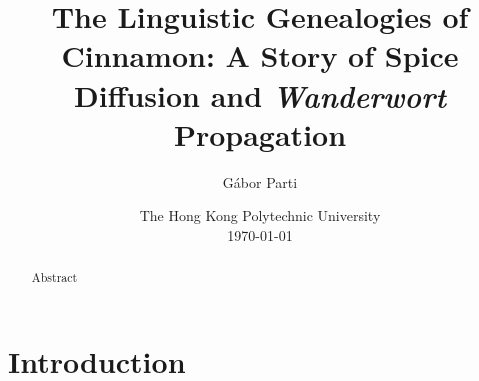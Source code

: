 \documentclass[12pt]{article}
\title{The Linguistic Genealogies of Cinnamon: A Story of Spice Diffusion and \textit{Wanderwort} Propagation}
\author{Gábor Parti {\small\orcid{0000-0003-2042-4655}}}
\date{The Hong Kong Polytechnic University\\[2.5ex]\today}
\begin{document}

\maketitle

\begin{abstract}
    Abstract
\end{abstract}


\section{Introduction}










\end{document}
